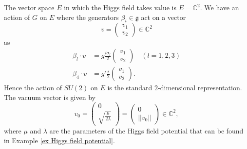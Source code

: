 \documentclass[11pt]{amsart}
\theoremstyle{definition}
\theoremstyle{remark}
\numberwithin{equation}{section}
\begin{document}
The vector space $E$ in which the Higgs field takes value is $E=\mathbb{C}^2$. We have an action of $G$ on $E$ where the generators $\beta_i\in\mathfrak{g}$ act on a vector 
\begin{equation*}
v=\left(\begin{array}{c}v_1\\v_2\end{array}\right)\in\mathbb{C}^2
\end{equation*}
as 
\begin{align*}
\beta_l\cdot v&=g\frac{i\sigma_l}{2}\left(\begin{array}{c}v_1\\v_2\end{array}\right)\quad(l=1,2,3)\\
\beta_4\cdot v&=g'\frac{i}{2}\left(\begin{array}{c}v_1\\v_2\end{array}\right).
\end{align*}
Hence the action of $SU(2)$ on $E$ is the standard $2$-dimensional representation. The vacuum vector is given by 
\begin{equation*}
v_0=\left(\begin{array}{c}0\\\sqrt{\frac{\mu}{2\lambda}}\end{array}\right)=\left(\begin{array}{c}0\\||v_0||\end{array}\right)\in\mathbb{C}^2,
\end{equation*}
where $\mu$ and $\lambda$ are the parameters of the Higgs field potential that can be found in Example \ref{ex Higgs field potential}.
\end{document}
